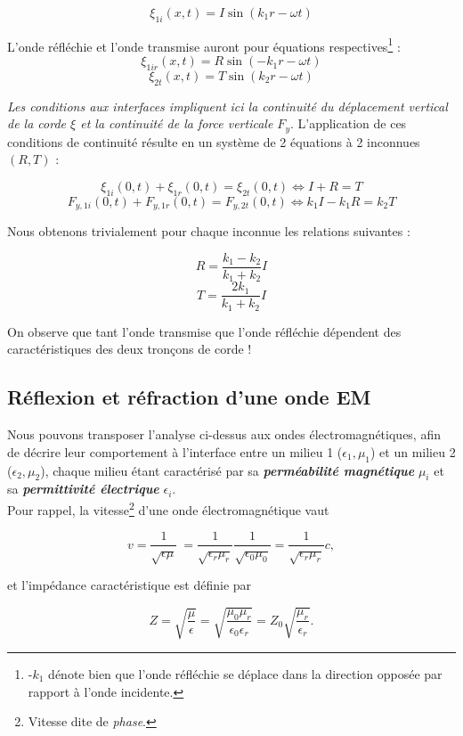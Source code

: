 \[ \xi_{1i}(x,t) = I \sin(k_{1}r - \omega t) \]

L'onde réfléchie et l'onde transmise auront pour équations respectives\footnote{-$k_{1}$ dénote bien que l'onde réfléchie se déplace dans la direction opposée par rapport à l'onde incidente.} : 
\[ \xi_{1ir}(x,t) = R \sin(-k_{1}r - \omega t) \]
\[ \xi_{2t}(x,t) = T \sin(k_{2}r - \omega t) \]

\textit{Les conditions aux interfaces impliquent ici la continuité du déplacement vertical de la corde $\xi$ et la continuité de la force 
verticale $F_y$}.  L'application de ces conditions de continuité résulte en un système de 2 équations à 2 inconnues $(R,T)$ :

\[\xi_{1i}(0,t) + \xi_{1r}(0,t) = \xi_{2t}(0,t) \Leftrightarrow I + R = T\]
\[F_{y,1i}(0,t) + F_{y,1r}(0,t) = F_{y,2t}(0,t) \Leftrightarrow k_{1}I - k_{1}R = k_{2}T\]

Nous obtenons trivialement pour chaque inconnue les relations suivantes : 

\[R = \frac{k_{1} - k_{2}}{k_{1} + k_{2}}I\]
\[T = \frac{2 k_{1}}{k_{1} + k_{2}}I\]

On observe que tant l'onde transmise que l'onde réfléchie dépendent des caractéristiques des deux tronçons de corde !



\subsection{Réflexion et réfraction d'une onde EM} 


Nous pouvons transposer l'analyse ci-dessus aux ondes électromagnétiques, afin de décrire leur comportement à l'interface entre un milieu 1 ($\epsilon_{1}, \mu_{1}$) et un milieu 2 ($\epsilon_{2},\mu_{2}$), chaque milieu étant caractérisé par sa \textit{\textbf{perméabilité magnétique}} $\mu_i$
et sa \textbf{\textit{permittivité électrique}} $\epsilon_i$.  \\

Pour rappel, la vitesse\footnote{Vitesse dite de \textit{phase}.} d'une onde électromagnétique vaut  

\[v = \frac{1}{\sqrt{\epsilon \mu}}\ = \frac{1}{\sqrt{\epsilon_{r} \mu_{r}}} \frac{1}{\sqrt{\epsilon_{0} \mu_{0}}} = \frac{1}{\sqrt{\epsilon_{r} \mu_{r}}} c,  \] 

et l'impédance caractéristique est définie par 

\[Z = \sqrt{\frac{\mu}{\epsilon}} = \sqrt{\frac{\mu_0\mu_r}{\epsilon_0\epsilon_r}} = Z_0 \sqrt{\frac{\mu_r}{\epsilon_r}}.  \]

